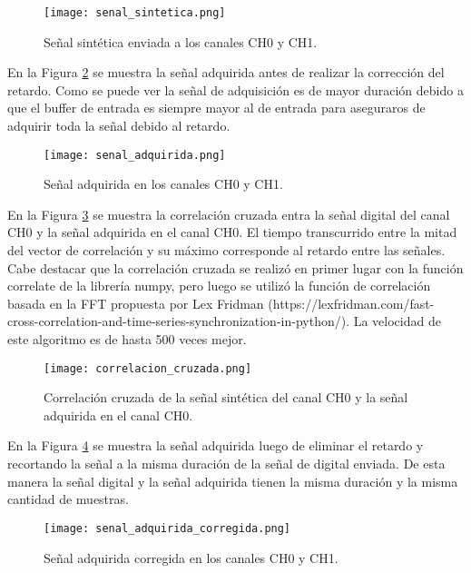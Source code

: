 \documentclass[a4paper, 11pt]{article}
\begin{document}
\begin{figure} [H]
\centering
\texttt{[image: senal\_sintetica.png]}
\caption{Señal sintética enviada a los canales CH0 y CH1. \label{fig:senal_sintetica}}
\end{figure} 

En la Figura \ref{fig:senal_adquirida} se muestra la señal adquirida antes de realizar la corrección del retardo. Como se puede ver la señal de adquisición es de mayor duración debido a que el buffer de entrada es siempre mayor al de entrada para aseguraros de adquirir toda la señal debido al retardo.


\begin{figure} [H]
\centering
\texttt{[image: senal\_adquirida.png]}
\caption{Señal adquirida en los canales CH0 y CH1. \label{fig:senal_adquirida}}
\end{figure} 

En la Figura \ref{fig:correlacion_cruzada} se muestra la correlación cruzada entra la señal digital del canal CH0 y la señal adquirida en el canal CH0. El tiempo transcurrido entre la mitad del vector de correlación y su máximo corresponde al retardo entre las señales. Cabe destacar que la correlación cruzada se realizó en primer lugar con la función correlate de la librería numpy, pero luego se utilizó la función de correlación basada en la FFT propuesta por Lex Fridman (https://lexfridman.com/fast-cross-correlation-and-time-series-synchronization-in-python/). La velocidad de este algoritmo es de hasta 500 veces mejor. 
 
\begin{figure} [H]
\centering
\texttt{[image: correlacion\_cruzada.png]}
\caption{Correlación cruzada de la señal sintética del canal CH0 y la señal adquirida en el canal CH0.\label{fig:correlacion_cruzada}}
\end{figure} 

En la Figura \ref{fig:senal_adquirida_corregida} se muestra la señal adquirida luego de eliminar el retardo y recortando la señal a la misma duración de la señal de digital enviada. De esta manera la señal digital y la señal adquirida tienen la misma duración y la misma cantidad de muestras.
 
\begin{figure} [H]
\centering
\texttt{[image: senal\_adquirida\_corregida.png]}
\caption{Señal adquirida corregida en los canales CH0 y CH1. \label{fig:senal_adquirida_corregida}}
\end{figure} 
 
\end{document}
